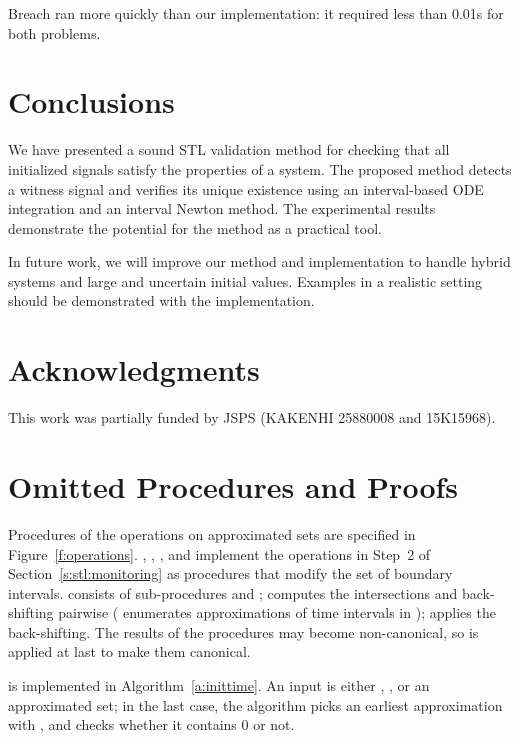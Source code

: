 \documentclass[paper]{ieice}
\begin{document}
Breach ran more quickly than our implementation: it required less than 0.01s for both problems.


\section{Conclusions}

We have presented a sound STL validation method for checking that all initialized signals satisfy the properties of a system.
The proposed method detects a witness signal and verifies its unique existence using an interval-based ODE integration and an interval Newton method.
The experimental results demonstrate the potential for the method as a practical tool.


In future work, we will improve our method and implementation to handle hybrid systems and large and uncertain initial values.
Examples in a realistic setting should be demonstrated with the implementation.

\section*{Acknowledgments}

This work was partially funded by JSPS (KAKENHI 25880008 and 15K15968).






\appendix*
\section{Omitted Procedures and Proofs}

Procedures of the operations on approximated sets are specified in Figure~\ref{f:operations}.
, , , and  implement the operations in Step~2 of Section~\ref{s:stl:monitoring} as procedures that modify the set of boundary intervals.
 consists of sub-procedures  and ;  computes the intersections and back-shifting pairwise ( enumerates approximations of time intervals in );  applies the back-shifting.
The results of the procedures may become non-canonical, so  is applied at last to make them canonical.



 is implemented in Algorithm~\ref{a:inittime}.
An input  is either , , or an approximated set;
in the last case, the algorithm picks an earliest approximation with , and checks whether it contains 0 or not.

\begin{figure*}[t]

\caption{\label{f:operations} Procedures for approximated sets of consistent time intervals}
\end{figure*}
\end{document}
